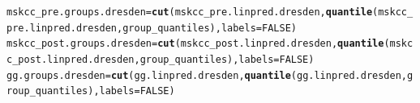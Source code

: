 \documentclass{article}\usepackage[]{graphicx}\usepackage[]{color}
\makeatletter
\newcommand{\hlnum}[1]{\textcolor[rgb]{0.686,0.059,0.569}{#1}}%
\newcommand{\hlstd}[1]{\textcolor[rgb]{0.345,0.345,0.345}{#1}}%
\newcommand{\hlkwb}[1]{\textcolor[rgb]{0.69,0.353,0.396}{#1}}%
\newcommand{\hlkwc}[1]{\textcolor[rgb]{0.333,0.667,0.333}{#1}}%
\newcommand{\hlkwd}[1]{\textcolor[rgb]{0.737,0.353,0.396}{\textbf{#1}}}%
\newenvironment{kframe}{%
 \def\at@end@of@kframe{}%
 \ifinner\ifhmode%
  \def\at@end@of@kframe{\end{minipage}}%
  \begin{minipage}{\columnwidth}%
 \fi\fi%
 \def\FrameCommand##1{\hskip\@totalleftmargin \hskip-\fboxsep
 \colorbox{shadecolor}{##1}\hskip-\fboxsep
     \hskip-\linewidth \hskip-\@totalleftmargin \hskip\columnwidth}%
 \MakeFramed {\advance\hsize-\width
   \@totalleftmargin\z@ \linewidth\hsize
   \@setminipage}}%
 {\par\unskip\endMakeFramed%
 \at@end@of@kframe}
\newenvironment{knitrout}{}{} %
\makeatother
\begin{document}
\begin{knitrout}
\color{fgcolor}\begin{kframe}
\begin{alltt}
\hlstd{mskcc_pre.groups.dresden} \hlkwb{=} \hlkwd{cut}\hlstd{(mskcc_pre.linpred.dresden,} \hlkwd{quantile}\hlstd{(mskcc_pre.linpred.dresden, group_quantiles),} \hlkwc{labels} \hlstd{=} \hlnum{FALSE}\hlstd{)}
\hlstd{mskcc_post.groups.dresden} \hlkwb{=} \hlkwd{cut}\hlstd{(mskcc_post.linpred.dresden,} \hlkwd{quantile}\hlstd{(mskcc_post.linpred.dresden, group_quantiles),} \hlkwc{labels} \hlstd{=} \hlnum{FALSE}\hlstd{)}
\hlstd{gg.groups.dresden} \hlkwb{=} \hlkwd{cut}\hlstd{(gg.linpred.dresden,} \hlkwd{quantile}\hlstd{(gg.linpred.dresden, group_quantiles),} \hlkwc{labels} \hlstd{=} \hlnum{FALSE}\hlstd{)}


\end{alltt}
\end{kframe}
\end{knitrout}
\end{document}
